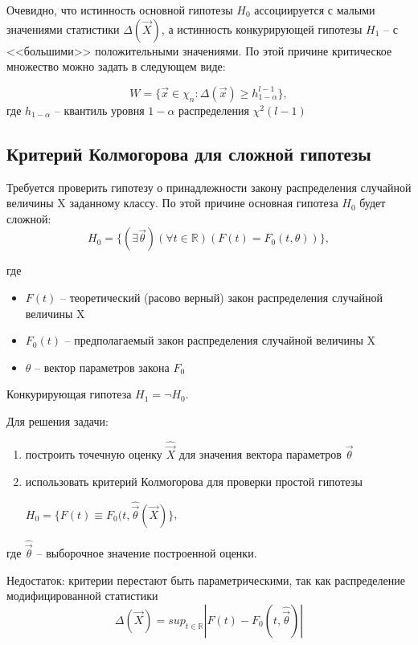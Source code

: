 \documentclass[a4paper, 12pt]{article}
\theoremstyle{definition}
\theoremstyle{leads}
\theoremstyle{example}
\theoremstyle{remark}
\begin{document}
Очевидно, что истинность основной гипотезы $H_0$ ассоциируется с малыми значениями статистики $\Delta(\vec{X})$, а истинность конкурирующей гипотезы $H_1$ -- с <<большими>> положительными значениями. По этой причине критическое множество можно задать в следующем виде:

\begin{equation*}
	W = \{ \vec{x} \in \chi_n : \Delta(\vec{x}) \geq h_{1 - \alpha}^{l - 1} \},
\end{equation*}
где $h_{1 - \alpha}$ -- квантиль уровня $1 - \alpha$ распределения $\chi^2 (l - 1)$


\subsection{Критерий Колмогорова для сложной гипотезы}

Требуется проверить гипотезу о принадлежности закону распределения случайной величины X заданному классу. По этой причине основная гипотеза $H_0$ будет сложной: 
\begin{equation*}
	H_0 = \{ (\exists \vec{\theta}) (\forall t \in \mathbb{R}) (F(t) = F_0(t, \theta)) \},
\end{equation*}

где 
\begin{itemize}
	\item $F(t)$ -- теоретический (расово верный) закон распределения случайной величины X
	\item $F_0(t)$ -- предполагаемый закон распределения случайной величины X
	\item $\theta$ -- вектор параметров закона $F_0$
\end{itemize}

Конкурирующая гипотеза $H_1 = \neg H_0$.

Для решения задачи:

\begin{enumerate}
	\item построить точечную оценку $\hat{\vec{X}}$ для значения вектора параметров $\vec{\theta}$
	\item использовать критерий Колмогорова для проверки простой гипотезы 
	
	$H_0 = \{ F(t) \equiv F_0(t, \hat{\vec{\theta}}(\vec{X})\}$,
\end{enumerate}

где $\hat{\vec{\theta}}$ -- выборочное значение построенной оценки.

Недостаток: критерии перестают быть параметрическими, так как распределение модифицированной статистики 
\begin{equation*}
	\Delta(\vec{X}) = sup_{t \in \mathbb{R}} |F(t) - F_0(t, \hat{\vec{\theta}})|
\end{equation*}
\end{document}
